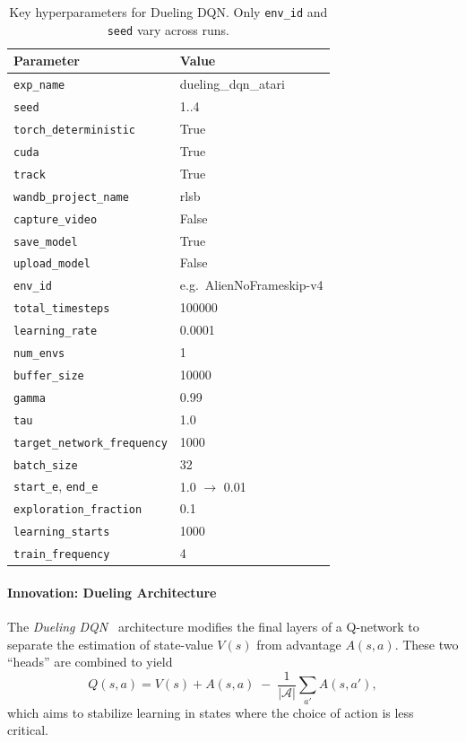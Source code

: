 \begin{table}
	\caption{Key hyperparameters for Dueling DQN. Only \texttt{env\_id} and \texttt{seed} vary across runs.}
	\label{tab:dueling_dqn_hyperparams}
	\centering
	\begin{tabular}{ll}
		\toprule
		\textbf{Parameter} & \textbf{Value} \\
		\midrule
		\texttt{exp\_name}                & dueling\_dqn\_atari \\
		\texttt{seed}                     & 1..4 \\
		\texttt{torch\_deterministic}     & True \\
		\texttt{cuda}                     & True \\
		\texttt{track}                    & True \\
		\texttt{wandb\_project\_name}     & rlsb \\
		\texttt{capture\_video}           & False \\
		\texttt{save\_model}              & True \\
		\texttt{upload\_model}            & False \\
		\texttt{env\_id}                  & e.g.\ AlienNoFrameskip-v4 \\
		\texttt{total\_timesteps}         & 100000 \\
		\texttt{learning\_rate}           & 0.0001 \\
		\texttt{num\_envs}                & 1 \\
		\texttt{buffer\_size}             & 10000 \\
		\texttt{gamma}                    & 0.99 \\
		\texttt{tau}                      & 1.0 \\
		\texttt{target\_network\_frequency} & 1000 \\
		\texttt{batch\_size}             & 32 \\
		\texttt{start\_e}, \texttt{end\_e} & 1.0 $\to$ 0.01 \\
		\texttt{exploration\_fraction}    & 0.1 \\
		\texttt{learning\_starts}         & 1000 \\
		\texttt{train\_frequency}         & 4 \\
		\bottomrule
	\end{tabular}
\end{table}

\paragraph{Innovation: Dueling Architecture}
The \emph{Dueling DQN}~\cite{wang:dueling} architecture modifies the final layers of a Q-network
to separate the estimation of state-value $V(s)$ from advantage $A(s,a)$.
These two “heads” are combined to yield
\[
Q(s,a) = V(s) + A(s,a) \;-\; \frac{1}{|\mathcal{A}|}\sum_{a'} A(s,a'),
\]
which aims to stabilize learning in states where the choice of action is less critical.

